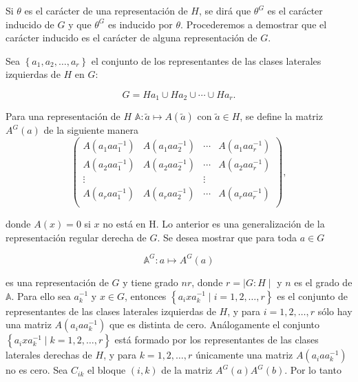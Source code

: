 \documentclass[12pt]{book}
\theoremstyle{definition}
\newcounter{in}
\begin{document}
Si $\theta$ es el carácter de una representación de $H$, se dirá que
$\theta^{G}$ es el carácter inducido de $G$ y que $\theta^{G}$ es
inducido por $\theta$. Procederemos a demostrar que el carácter
inducido es el carácter de alguna representación de $G$.

Sea $\left\{ a_{1}, a_{2},\ldots,a_{r}\right\}$ el conjunto de los
representantes de las clases laterales izquierdas de $H$ en $G$:

\begin{equation*}
  G = Ha_{1} \cup Ha_{2} \cup \cdots \cup Ha_{r}.
\end{equation*}

Para una representación de $H$
$\mathbb{A} \colon \tilde{a} \mapsto A(\tilde{a})$ con
$\tilde{a} \in H$, se define la matriz $A^{G}(a)$ de la siguiente
manera
\begin{equation*}
  \begin{pmatrix}
    A(a_{1} a a_{1}^{-1}) & A(a_{1} a a_{2}^{-1}) & \cdots &  A(a_{1} a a_{r}^{-1}) \\
    A(a_{2} a a_{1}^{-1}) & A(a_{2} a a_{2}^{-1}) & \cdots &  A(a_{2} a a_{r}^{-1}) \\
    \vdots &  & \vdots \\
    A(a_{r} a a_{1}^{-1}) & A(a_{r} a a_{2}^{-1}) & \cdots &  A(a_{r} a a_{r}^{-1}) \\
  \end{pmatrix},
\end{equation*}

donde $A(x)=0$ si $x$ no está en H. Lo anterior es una generalización
de la representación regular derecha de $G$. Se desea mostrar que para
toda $a \in G$

\begin{equation*}
  \mathbb{A}^{G} \colon a \mapsto A^{G}(a)
\end{equation*}

es una representación de $G$ y tiene grado $nr$, donde
$r= \mid G : H \mid$ y $n$ es el grado de $\mathbb{A}$. Para ello sea
$a_{k}^{-1}$ y $x \in G$, entonces
$\left\{ a_{i} x a_{k}^{-1} \mid i = 1, 2, \ldots, r \right\}$ es el
conjunto de representantes de las clases laterales izquierdas de $H$,
y para $i = 1, 2, \ldots, r$ sólo hay una matriz
$A(a_{i} a a_{k}^{-1})$ que es distinta de cero. Análogamente el
conjunto
$\left\{ a_{i} x a_{k}^{-1} \mid k = 1, 2, \ldots, r \right\}$ está
formado por los representantes de las clases laterales derechas de
$H$, y para $ k = 1, 2, \ldots, r$ únicamente una matriz
$A(a_{i} a a_{k}^{-1})$ no es cero. Sea $C_{ik}$ el bloque $(i,k)$ de
la matriz $A^{G}(a)A^{G}(b)$. Por lo tanto
\end{document}
